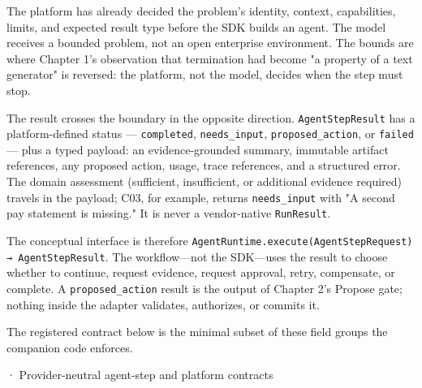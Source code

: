 The platform has already decided the problem’s identity, context, capabilities, limits, and expected result type before the SDK builds an agent. The model receives a bounded problem, not an open enterprise environment. The bounds are where Chapter 1's observation that termination had become "a property of a text generator" is reversed: the platform, not the model, decides when the step must stop.\par

The result crosses the boundary in the opposite direction. \lstinline[style=bookinline]!AgentStepResult! has a platform-defined status — \lstinline[style=bookinline]!completed!, \lstinline[style=bookinline]!needs_input!, \lstinline[style=bookinline]!proposed_action!, or \lstinline[style=bookinline]!failed! — plus a typed payload: an evidence-grounded summary, immutable artifact references, any proposed action, usage, trace references, and a structured error. The domain assessment (sufficient, insufficient, or additional evidence required) travels in the payload; C03, for example, returns \lstinline[style=bookinline]!needs_input! with "A second pay statement is missing." It is never a vendor-native \lstinline[style=bookinline]!RunResult!.\par

The conceptual interface is therefore \lstinline[style=bookinline]!AgentRuntime.execute(AgentStepRequest) → AgentStepResult!. The workflow—not the SDK—uses the result to choose whether to continue, request evidence, request approval, retry, compensate, or complete. A \lstinline[style=bookinline]!proposed_action! result is the output of Chapter 2's Propose gate; nothing inside the adapter validates, authorizes, or commits it.\par

The registered contract below is the minimal subset of these field groups the companion code enforces.\par

\BookSnake · Provider-neutral agent-step and platform contracts\par


